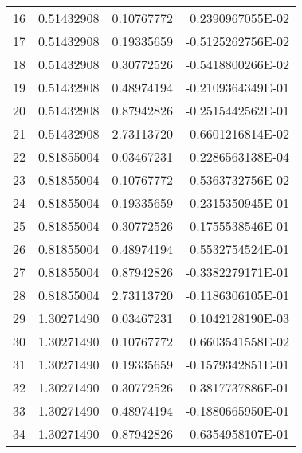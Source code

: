 \begin{longtable}{@{\extracolsep{\fill}}cllr@{}}
16  &  0.51432908  &  0.10767772  &   0.2390967055E-02 \\

17  &  0.51432908  &  0.19335659  &  -0.5125262756E-02 \\

18  &  0.51432908  &  0.30772526  &  -0.5418800266E-02 \\

19  &  0.51432908  &  0.48974194  &  -0.2109364349E-01 \\

20  &  0.51432908  &  0.87942826  &  -0.2515442562E-01 \\

21  &  0.51432908  &  2.73113720  &   0.6601216814E-02 \\

22  &  0.81855004  &  0.03467231  &   0.2286563138E-04 \\

23  &  0.81855004  &  0.10767772  &  -0.5363732756E-02 \\

24  &  0.81855004  &  0.19335659  &   0.2315350945E-01 \\

25  &  0.81855004  &  0.30772526  &  -0.1755538546E-01 \\

26  &  0.81855004  &  0.48974194  &   0.5532754524E-01 \\

27  &  0.81855004  &  0.87942826  &  -0.3382279171E-01 \\

28  &  0.81855004  &  2.73113720  &  -0.1186306105E-01 \\

29  &  1.30271490  &  0.03467231  &   0.1042128190E-03 \\

30  &  1.30271490  &  0.10767772  &   0.6603541558E-02 \\

31  &  1.30271490  &  0.19335659  &  -0.1579342851E-01 \\

32  &  1.30271490  &  0.30772526  &   0.3817737886E-01 \\

33  &  1.30271490  &  0.48974194  &  -0.1880665950E-01 \\

34  &  1.30271490  &  0.87942826  &   0.6354958107E-01 \\


\end{longtable}
